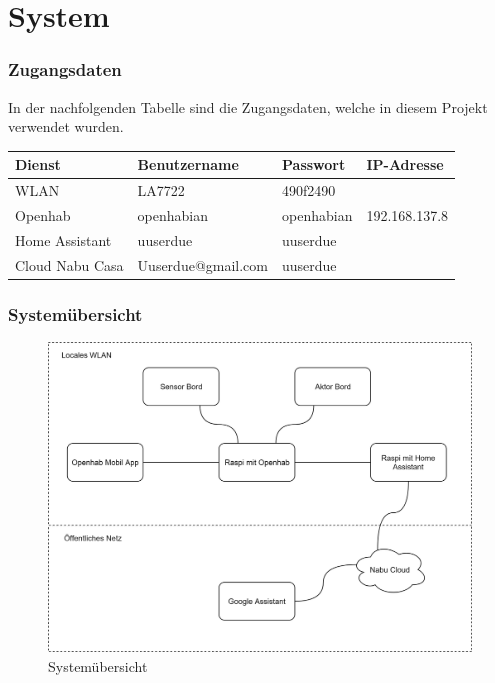 \section{System}\label{sec:Schluss}
\subsubsection{Zugangsdaten}
In der nachfolgenden Tabelle sind die Zugangsdaten, welche in diesem Projekt verwendet wurden.

\begin{table}[H]
	\centering
	\begin{tabular}{|l|l|l|l|}
		\hline 
		Dienst & Benutzername & Passwort & IP-Adresse \\ 
		\hline 
		WLAN & LA7722 & 490f2490 &  \\ 
		\hline 
		Openhab & openhabian & openhabian & 192.168.137.8 \\ 
		\hline 
		Home Assistant & uuserdue & uuserdue &  \\ 
		\hline 
		Cloud Nabu Casa & Uuserdue@gmail.com&uuserdue&\\
		\hline
	\end{tabular} 
\end{table}
\subsubsection{Systemübersicht}
   \begin{figure}[H]
	\centering
	\includegraphics[width=\textwidth]{graphics/Systemubersicht.png}
	\caption{Systemübersicht} 	
	\label{pic: Systemübersicht}
\end{figure}




